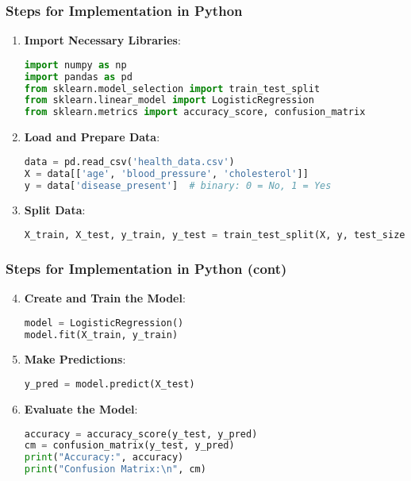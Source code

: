 \documentclass[aspectratio=169]{beamer}
\begin{document}
\begin{frame}[fragile]
    \frametitle{Steps for Implementation in Python}
    \begin{enumerate}
        \item \textbf{Import Necessary Libraries}:
        \begin{lstlisting}[language=Python]
import numpy as np
import pandas as pd
from sklearn.model_selection import train_test_split
from sklearn.linear_model import LogisticRegression
from sklearn.metrics import accuracy_score, confusion_matrix
        \end{lstlisting}

        \item \textbf{Load and Prepare Data}:
        \begin{lstlisting}[language=Python]
data = pd.read_csv('health_data.csv')
X = data[['age', 'blood_pressure', 'cholesterol']]
y = data['disease_present']  # binary: 0 = No, 1 = Yes
        \end{lstlisting}

        \item \textbf{Split Data}:
        \begin{lstlisting}[language=Python]
X_train, X_test, y_train, y_test = train_test_split(X, y, test_size=0.2, random_state=42)
        \end{lstlisting}
    \end{enumerate}
\end{frame}

\begin{frame}[fragile]
    \frametitle{Steps for Implementation in Python (cont)}
    \begin{enumerate}
        \setcounter{enumi}{3} %
        \item \textbf{Create and Train the Model}:
        \begin{lstlisting}[language=Python]
model = LogisticRegression()
model.fit(X_train, y_train)
        \end{lstlisting}

        \item \textbf{Make Predictions}:
        \begin{lstlisting}[language=Python]
y_pred = model.predict(X_test)
        \end{lstlisting}

        \item \textbf{Evaluate the Model}:
        \begin{lstlisting}[language=Python]
accuracy = accuracy_score(y_test, y_pred)
cm = confusion_matrix(y_test, y_pred)
print("Accuracy:", accuracy)
print("Confusion Matrix:\n", cm)
        \end{lstlisting}
    \end{enumerate}
\end{frame}
\end{document}
